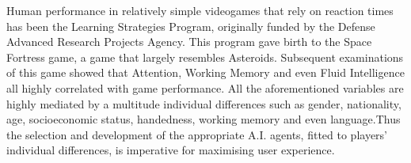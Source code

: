 Human performance in relatively simple videogames that rely on reaction times has been the Learning Strategies Program, originally funded by the Defense Advanced Research Projects Agency\cite{donchin1989learning}. This program gave birth to the Space Fortress game, a game that  largely resembles Asteroids\cite{boot2015video}. Subsequent examinations of this game showed that Attention, Working Memory and even Fluid Intelligence all highly correlated with game performance\cite{rabbitt1989space}. All the aforementioned variables are highly mediated by a multitude individual differences such as gender, nationality, age, socioeconomic status, handedness, working memory and even language\cite{lyle2008handedness}\cite{cazzato2010gender}\cite{stigler1986digit}\cite{templer2014relationship}\cite{greiner2014assessment}.Thus the selection and development of the appropriate A.I. agents, fitted to players’ individual differences, is imperative for maximising user experience. 
